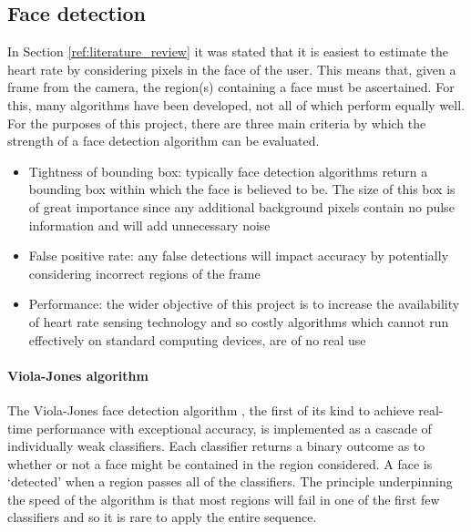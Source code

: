 \subsection{Face detection}
In Section \ref{ref:literature_review} it was stated that it is 
easiest to estimate the heart rate by considering pixels in the face of the user. 
This means that, given a frame from the camera, the region(s) containing a face must be ascertained. For this, many algorithms have been developed, not all of which perform equally well.
For the purposes of this project, there are three main criteria by which the strength of a face detection algorithm can be evaluated.
\begin{itemize}
    \item Tightness of bounding box: typically face detection algorithms return a bounding box within which the face is believed to be. The size of this box is of great importance since any additional background pixels contain no pulse information and will add unnecessary noise
    \item False positive rate: any false detections will impact accuracy by potentially considering incorrect regions of the frame
    \item Performance: the wider objective of this project is to increase the availability of heart rate sensing technology and so costly algorithms which cannot run effectively on standard computing devices, are of no real use
\end{itemize}


\paragraph{Viola-Jones algorithm} 
The Viola-Jones face detection algorithm \cite{Viola2004}, the first of its kind to achieve real-time performance with exceptional accuracy, is implemented as a cascade of 
individually weak classifiers. Each classifier returns a binary outcome as to whether or not a face might be contained in the region considered.
A face is `detected' when a region passes all of the classifiers. The principle underpinning the speed of the algorithm is that most regions will fail in one of the first few classifiers
and so it is rare to apply the entire sequence.

